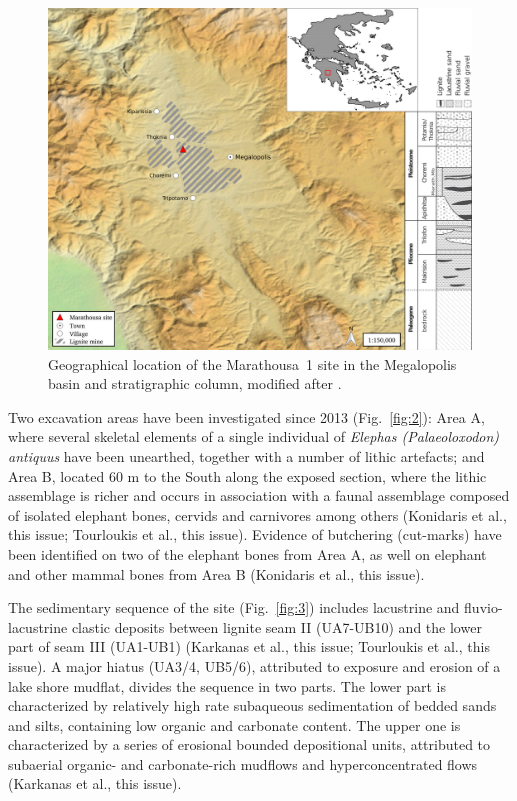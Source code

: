 \documentclass[preprint,authoryear,times]{elsarticle} %
\begin{document}
\begin{figure}[]
  \centering
  \includegraphics[width=1\textwidth]{../artwork/Fig1.png}
  \caption{Geographical location of the Marathousa~1 site in the Megalopolis basin and stratigraphic column, modified after \cite{Vugt2000}.}
  \label{fig:1}
\end{figure}

Two excavation areas have been investigated since 2013 (Fig.~\ref{fig:2}): Area A, where several skeletal elements of a single individual of \emph{Elephas (Palaeoloxodon) antiquus} have been unearthed, together with a number of lithic artefacts; and Area B, located 60 m to the South along the exposed section, where the lithic assemblage is richer and occurs in association with a faunal assemblage composed of isolated elephant bones, cervids and carnivores among others (Konidaris et al., this issue; Tourloukis et al., this issue). Evidence of butchering (cut-marks) have been identified on two of the elephant bones from Area A, as well on elephant and other mammal bones from Area B (Konidaris et al., this issue).


The sedimentary sequence of the site (Fig.~\ref{fig:3}) includes lacustrine and fluvio-lacustrine clastic deposits between lignite seam II (UA7-UB10) and the lower part of seam III (UA1-UB1) (Karkanas et al., this issue; Tourloukis et al., this issue). A major hiatus (UA3/4, UB5/6), attributed to exposure and erosion of a lake shore mudflat, divides the sequence in two parts. The lower part is characterized by relatively high rate subaqueous sedimentation of bedded sands and silts, containing low organic and carbonate content. The upper one is characterized by a series of erosional bounded depositional units, attributed to subaerial organic- and carbonate-rich mudflows and hyperconcentrated flows (Karkanas et al., this issue).
\end{document}
